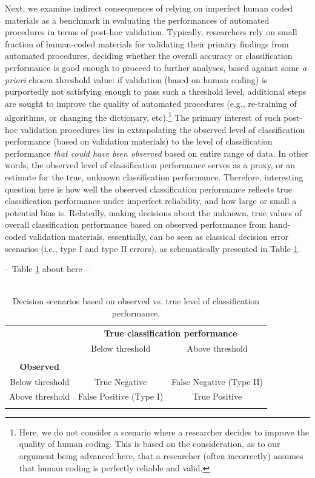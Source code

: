 \documentclass[man, 12pt, a4paper, nolmodern, noextraspace]{apa6}
\begin{document}
Next, we examine indirect consequences of relying on imperfect human coded materials as a benchmark in evaluating the performances of automated procedures in terms of post-hoc validation. Typically, researchers rely on  small fraction of human-coded materials for validating their primary findings from automated procedures, deciding whether the overall accuracy or classification performance is good enough to proceed to further analyses, based against some \textit{a priori} chosen threshold value: if validation (based on human coding) is purportedly not satisfying enough to pass such a threshold level, additional steps are sought to improve the quality of automated procedures (e.g., re-training of algorithms, or changing the dictionary, etc).\footnote{Here, we do not consider a scenario where a researcher decides to improve the quality of human coding. This is based on the consideration, as to our argument being advanced here, that a researcher (often incorrectly) assumes that human coding is perfectly reliable and valid.} The primary interest of such post-hoc validation procedures lies in extrapolating the observed level of classification performance (based on validation materials) to the level of classification performance \textit{that could have been observed} based on entire range of data. In other words, the observed level of classification performance serves as a proxy, or an estimate for the true, unknown classification performance. Therefore, interesting question here is how well the observed classification performance reflects true classification performance under imperfect reliability, and how large or small a potential bias is. Relatedly, making decisions about the unknown, true values of overall classification performance based on observed performance from hand-coded validation materials, essentially, can be seen as classical decision error scenarios (i.e., type I and type II errors), as schematically presented in Table \ref{tab:Table1}.
\centerline{ -- Table \ref{tab:Table1} about here -- }    

\begin{table}[!htbp] \centering 
	\begin{minipage}{1.1\textwidth}
    \centering
  \caption{\\ Decision scenarios based on observed vs. true level of classification performance.} 
  \label{tab:Table1} 
        \centering
  \begin{tabular}{ ccc}
\toprule
      \multicolumn{1}{c}{} &
      \multicolumn{2}{c}{\textbf{True classification performance}} \\
\cline{2-3}
 & Below threshold & Above threshold \\
\hline \\[-1.8ex] 
  \textbf{Observed} & & \\  
 Below threshold & True Negative & False Negative (Type II) \\ 
 Above threshold & False Positive (Type I) & True Positive \\ 
\hline \\[-1.8ex]  
	\end{tabular}
 	\end{minipage}
\end{table} 
\end{document}
